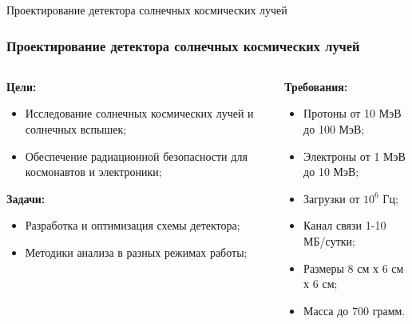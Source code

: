 \begin{frame}
    \begin{center}
        \Huge
         Проектирование детектора солнечных космических лучей
    \end{center}
\end{frame}
%
%
\begin{frame}
    \frametitle{Проектирование детектора солнечных космических лучей}
                \begin{columns}
    	\begin{column}{0.6\textwidth}
    		\textbf{Цели:}
    		\begin{itemize}
    			\item Исследование солнечных космических лучей и
    			солнечных вспышек;
    			\item Обеспечение радиационной безопасности для космонавтов
    			и электроники;
    		\end{itemize}
    		\textbf{Задачи:}
    		\begin{itemize}
    			\item Разработка и оптимизация схемы детектора;
    			\item Методики анализа в разных режимах работы;
    		\end{itemize}
    	\end{column}
    	\begin{column}{0.4\textwidth}
    		\textbf{Требования:}
    	\begin{itemize}
    			\item Протоны от 10 МэВ до 100 МэВ;
    			\item Электроны от 1 МэВ до 10 МэВ;
    			\item Загрузки от $10^6$ Гц;
    			\item Канал связи 1-10 МБ/сутки;
    			\item Размеры  8 см х 6 см х 6 см;
    			\item Масса до 700 грамм.
    	\end{itemize}
    	\end{column}
    \end{columns} 
\end{frame}

